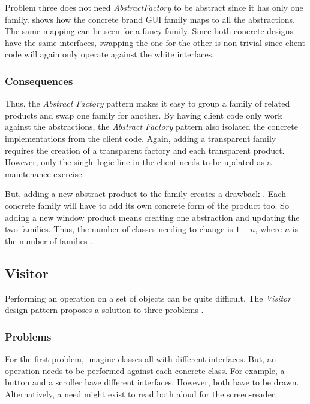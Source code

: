 Problem three does not need \textit{AbstractFactory} to be abstract since it has only one family.
 shows how the concrete brand GUI family maps to all the abstractions.
The same mapping can be seen for a fancy family.
Since both concrete designs have the same interfaces, swapping the one for the other is non-trivial since client code will again only operate against the white interfaces.

\subsubsection{Consequences}
Thus, the \textit{Abstract Factory} pattern makes it easy to group a family of related products and swap one family for another.
By having client code only work against the abstractions, the \textit{Abstract Factory} pattern also isolated the concrete implementations from the client code.
Again, adding a transparent family requires the creation of a transparent factory and each transparent product.
However, only the single logic line in the client needs to be updated as a maintenance exercise.

But, adding a new abstract product to the family creates a drawback \cite{gamma_94_01}.
Each concrete family will have to add its own concrete form of the product too.
So adding a new window product means creating one abstraction and updating the two families.
Thus, the number of classes needing to change is \(1 + n\), where \(n\) is the number of families \cite{bulajic_12_01}.


\subsection{Visitor}
Performing an operation on a set of objects can be quite difficult.
The \textit{Visitor} design pattern proposes a solution to three problems \cite{gamma_94_01}.

\subsubsection{Problems}
For the first problem, imagine classes all with different interfaces.
But, an operation needs to be performed against each concrete class.
For example, a button and a scroller have different interfaces.
However, both have to be drawn.
Alternatively, a need might exist to read both aloud for the screen-reader.

